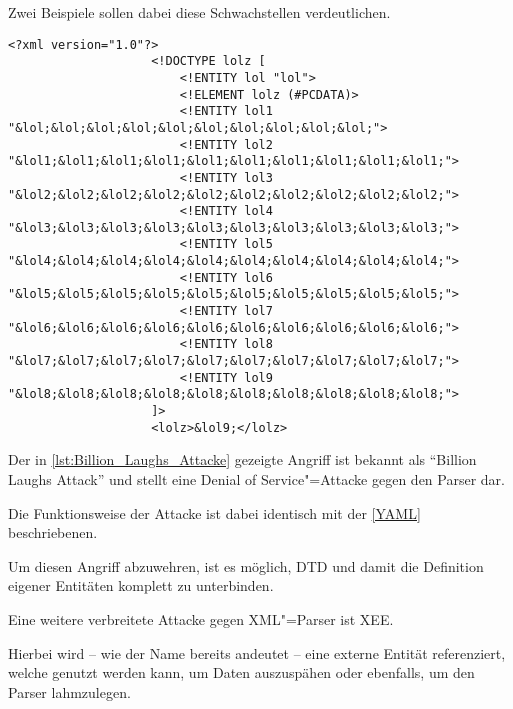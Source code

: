                 Zwei Beispiele sollen dabei diese Schwachstellen verdeutlichen.

                \begin{lstlisting}[caption={Billion Laughs-Attacke}, label={lst:Billion_Laughs_Attacke}, gobble=20]
                    <?xml version="1.0"?>
                    <!DOCTYPE lolz [
                        <!ENTITY lol "lol">
                        <!ELEMENT lolz (#PCDATA)>
                        <!ENTITY lol1 "&lol;&lol;&lol;&lol;&lol;&lol;&lol;&lol;&lol;&lol;">
                        <!ENTITY lol2 "&lol1;&lol1;&lol1;&lol1;&lol1;&lol1;&lol1;&lol1;&lol1;&lol1;">
                        <!ENTITY lol3 "&lol2;&lol2;&lol2;&lol2;&lol2;&lol2;&lol2;&lol2;&lol2;&lol2;">
                        <!ENTITY lol4 "&lol3;&lol3;&lol3;&lol3;&lol3;&lol3;&lol3;&lol3;&lol3;&lol3;">
                        <!ENTITY lol5 "&lol4;&lol4;&lol4;&lol4;&lol4;&lol4;&lol4;&lol4;&lol4;&lol4;">
                        <!ENTITY lol6 "&lol5;&lol5;&lol5;&lol5;&lol5;&lol5;&lol5;&lol5;&lol5;&lol5;">
                        <!ENTITY lol7 "&lol6;&lol6;&lol6;&lol6;&lol6;&lol6;&lol6;&lol6;&lol6;&lol6;">
                        <!ENTITY lol8 "&lol7;&lol7;&lol7;&lol7;&lol7;&lol7;&lol7;&lol7;&lol7;&lol7;">
                        <!ENTITY lol9 "&lol8;&lol8;&lol8;&lol8;&lol8;&lol8;&lol8;&lol8;&lol8;&lol8;">
                    ]>
                    <lolz>&lol9;</lolz>
                \end{lstlisting}

                Der in
                \vref{lst:Billion_Laughs_Attacke} gezeigte Angriff ist bekannt als
                \foreignquote{english}{Billion Laughs Attack} und
                stellt eine Denial of Service"=Attacke gegen den Parser dar.

                Die Funktionsweise der Attacke ist dabei identisch
                mit der
                \vref{YAML} beschriebenen.

                Um diesen Angriff abzuwehren,
                ist es möglich,
                \gls{DTD} und
                damit die Definition eigener Entitäten komplett zu unterbinden.\cite{Sullivan2009}

                Eine weitere verbreitete Attacke gegen
                \gls{XML}"=Parser ist
                \gls{XEE}.

                Hierbei wird
                --
                wie der Name bereits andeutet
                -- eine externe Entität referenziert,
                welche genutzt werden kann,
                um Daten auszuspähen oder
                ebenfalls,
                um den Parser lahmzulegen.

